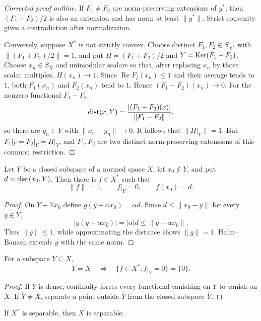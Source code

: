 \begin{proof}[Corrected proof outline]
If $F_1\ne F_2$ are norm-preserving extensions of $y^*$, then
$(F_1+F_2)/2$ is also an extension and has norm at least $\|y^*\|$.
Strict convexity gives a contradiction after normalization.

Conversely, suppose $X^*$ is not strictly convex.  Choose distinct
$F_1,F_2\in S_{X^*}$ with $\|(F_1+F_2)/2\|=1$, and put
$H=(F_1+F_2)/2$ and $Y=\operatorname{Ker}(F_1-F_2)$.  Choose $x_n\in S_X$ and unimodular
scalars so that, after replacing $x_n$ by those scalar multiples,
$H(x_n)\to1$.  Since $\operatorname{Re}F_j(x_n)\le1$ and their average
tends to $1$, both $F_1(x_n)$ and $F_2(x_n)$ tend to $1$.  Hence
$(F_1-F_2)(x_n)\to0$.  For the nonzero functional $F_1-F_2$,
\[
  \operatorname{dist}(x,Y)=\frac{|(F_1-F_2)(x)|}{\|F_1-F_2\|},
\]
so there are $y_n\in Y$ with $\|x_n-y_n\|\to0$.  It follows that
$\|H|_Y\|=1$.  But $F_1|_Y=F_2|_Y=H|_Y$, and $F_1,F_2$ are two distinct
norm-preserving extensions of this common restriction.
\end{proof}

\begin{notetheorem}
Let $Y$ be a closed subspace of a normed space $X$, let $x_0\notin Y$, and
put $d=\operatorname{dist}(x_0,Y)$.  Then there is $f\in X^*$ such that
\[
  \|f\|=1,
  \qquad
  f|_Y=0,
  \qquad
  f(x_0)=d.
\]
\end{notetheorem}

\begin{proof}
On $Y+\mathbb Kx_0$ define $g(y+\alpha x_0)=\alpha d$.  Since
$d\le\|x_0-y\|$ for every $y\in Y$,
\[
 |g(y+\alpha x_0)|=|\alpha|d
 \le\|y+\alpha x_0\|.
\]
Thus $\|g\|\le1$, while approximating the distance shows $\|g\|=1$.
Hahn--Banach extends $g$ with the same norm.
\end{proof}

\begin{notecorollary}
For a subspace $Y\subseteq X$,
\[
  \overline Y=X
  \quad\Longleftrightarrow\quad
  \{f\in X^*:f|_Y=0\}=\{0\}.
\]
\end{notecorollary}

\begin{proof}
If $Y$ is dense, continuity forces every functional vanishing on $Y$ to
vanish on $X$.  If $\overline Y\ne X$, separate a point outside
$\overline Y$ from the closed subspace $\overline Y$.
\end{proof}

\begin{notetheorem}
If $X^*$ is separable, then $X$ is separable.
\end{notetheorem}

